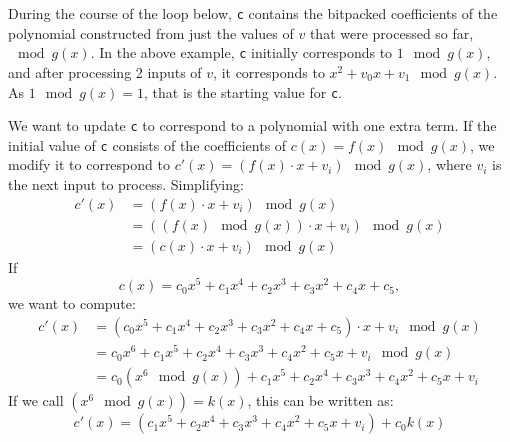 \documentclass[a4paper]{article}
\begin{document}
During the course of the loop below, \texttt{c} contains the bitpacked coefficients of
the polynomial constructed from just the values of $v$ that were processed so far,
$\mod g(x)$.
In the above example, \texttt{c} initially corresponds to $1 \mod g(x)$, and
after processing 2 inputs of $v$, it corresponds to $x^2 + v_0x + v_1 \mod g(x)$.
As $1 \mod g(x) = 1$, that is the starting value for \texttt{c}.
\begin{c++}[name=Code]
	uint32_t c = 1;
	for (const auto $v_i$ : values) {
\end{c++}
We want to update \texttt{c} to correspond to a polynomial with one extra term.
If the initial value of \texttt{c} consists of the coefficients of
$c(x) = f(x) \mod g(x)$, we modify it to correspond to
$c'(x) = (f(x) \cdot x + v_i) \mod g(x)$, where $v_i$ is the next input to process.
Simplifying:
\begin{equation}
\begin{aligned}
	c'(x)	&= (f(x) \cdot x + v_i) \mod g(x) \\
		&= ((f(x) \mod g(x)) \cdot x + v_i) \mod g(x) \\
		&= (c(x) \cdot x  + v_i) \mod g(x)
\end{aligned}
\end{equation}
If
\begin{equation*}
	c(x) = c_0x^5 + c_1x^4 + c_2x^3 + c_3x^2 + c_4x + c_5, 
\end{equation*}
we want to compute:
\begin{equation*}
\begin{aligned}
	c'(x)	&= (c_0x^5 + c_1x^4 + c_2x^3 + c_3x^2 + c_4x + c_5) \cdot x + v_i \mod g(x) \\
		&= c_0x^6 + c_1x^5 + c_2x^4 + c_3x^3 + c_4x^2 + c_5x + v_i \mod g(x) \\
		&= c_0(x^6 \mod g(x)) + c_1x^5 + c_2x^4 + c_3x^3 + c_4x^2 + c_5x + v_i
\end{aligned}
\end{equation*}
If we call $(x^6 \mod g(x)) = k(x)$, this can be written as:
\begin{equation*}
	c'(x)	= (c_1x^5 + c_2x^4 + c_3x^3 + c_4x^2 + c_5x + v_i) + c_0k(x)
\end{equation*}
\end{document}
